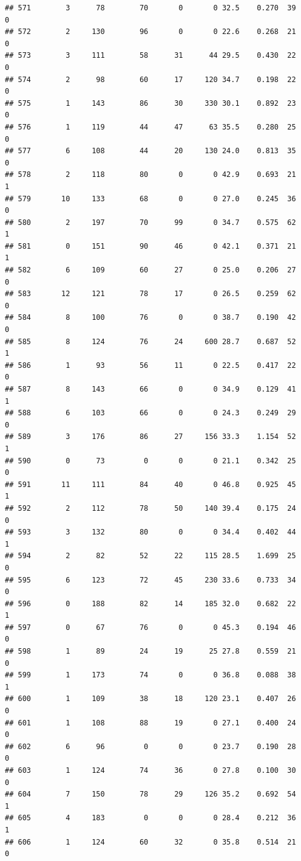 \documentclass[11pt, a4paper]{article}\usepackage[]{graphicx}\usepackage[]{xcolor}
\makeatletter
\newenvironment{kframe}{%
 \def\at@end@of@kframe{}%
 \ifinner\ifhmode%
  \def\at@end@of@kframe{\end{minipage}}%
  \begin{minipage}{\columnwidth}%
 \fi\fi%
 \def\FrameCommand##1{\hskip\@totalleftmargin \hskip-\fboxsep
 \colorbox{shadecolor}{##1}\hskip-\fboxsep
     \hskip-\linewidth \hskip-\@totalleftmargin \hskip\columnwidth}%
 \MakeFramed {\advance\hsize-\width
   \@totalleftmargin\z@ \linewidth\hsize
   \@setminipage}}%
 {\par\unskip\endMakeFramed%
 \at@end@of@kframe}
\newenvironment{knitrout}{}{} %
\makeatother
\begin{document}
\begin{knitrout}
\begin{kframe}
\begin{verbatim}
## 571        3      78        70       0       0 32.5    0.270  39    0
## 572        2     130        96       0       0 22.6    0.268  21    0
## 573        3     111        58      31      44 29.5    0.430  22    0
## 574        2      98        60      17     120 34.7    0.198  22    0
## 575        1     143        86      30     330 30.1    0.892  23    0
## 576        1     119        44      47      63 35.5    0.280  25    0
## 577        6     108        44      20     130 24.0    0.813  35    0
## 578        2     118        80       0       0 42.9    0.693  21    1
## 579       10     133        68       0       0 27.0    0.245  36    0
## 580        2     197        70      99       0 34.7    0.575  62    1
## 581        0     151        90      46       0 42.1    0.371  21    1
## 582        6     109        60      27       0 25.0    0.206  27    0
## 583       12     121        78      17       0 26.5    0.259  62    0
## 584        8     100        76       0       0 38.7    0.190  42    0
## 585        8     124        76      24     600 28.7    0.687  52    1
## 586        1      93        56      11       0 22.5    0.417  22    0
## 587        8     143        66       0       0 34.9    0.129  41    1
## 588        6     103        66       0       0 24.3    0.249  29    0
## 589        3     176        86      27     156 33.3    1.154  52    1
## 590        0      73         0       0       0 21.1    0.342  25    0
## 591       11     111        84      40       0 46.8    0.925  45    1
## 592        2     112        78      50     140 39.4    0.175  24    0
## 593        3     132        80       0       0 34.4    0.402  44    1
## 594        2      82        52      22     115 28.5    1.699  25    0
## 595        6     123        72      45     230 33.6    0.733  34    0
## 596        0     188        82      14     185 32.0    0.682  22    1
## 597        0      67        76       0       0 45.3    0.194  46    0
## 598        1      89        24      19      25 27.8    0.559  21    0
## 599        1     173        74       0       0 36.8    0.088  38    1
## 600        1     109        38      18     120 23.1    0.407  26    0
## 601        1     108        88      19       0 27.1    0.400  24    0
## 602        6      96         0       0       0 23.7    0.190  28    0
## 603        1     124        74      36       0 27.8    0.100  30    0
## 604        7     150        78      29     126 35.2    0.692  54    1
## 605        4     183         0       0       0 28.4    0.212  36    1
## 606        1     124        60      32       0 35.8    0.514  21    0

\end{verbatim}
\end{kframe}
\end{knitrout}
\end{document}
